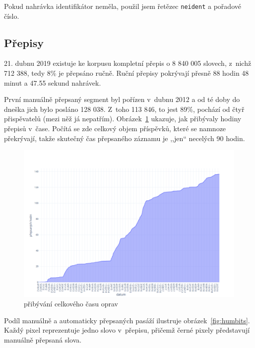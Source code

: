 Pokud nahrávka identifikátor neměla, použil jsem řetězec \texttt{neident} a
pořadové číslo.

\subsection{Přepisy}

21. dubnu 2019 existuje ke korpusu kompletní přepis o 8 840 005
slovech, z~nichž 712 388, tedy 8\% je přepsáno ručně.
Ruční přepisy pokrývají přesně 88 hodin 48 minut a 47.55 sekund nahrávek.

První manuálně přepsaný segment byl pořízen v~dubnu 2012 a od té doby do dneška
jich bylo posláno 128 038. Z~toho 113 846, to jest 89\%, pochází od čtyř
přispěvatelů (mezi něž já nepatřím).
Obrázek~\ref{fig:corpus-growth} ukazuje, jak přibývaly hodiny přepisů v~čase.
Počítá se zde celkový objem příspěvků, které se namnoze překrývají, takže
skutečný čas přepsaného záznamu je ,,jen`` necelých 90 hodin.

\begin{figure}[htpb]
\includegraphics[scale=0.39]{rc/corpus-growth.png}
\caption{přibývání celkového času oprav}
\label{fig:corpus-growth}
\end{figure}

Podíl manuálně a automaticky přepsaných pasáží ilustruje
obrázek~\ref{fig:humbits}. Každý pixel reprezentuje jedno slovo v~přepisu,
přičemž černé pixely představují manuálně přepsaná slova.

